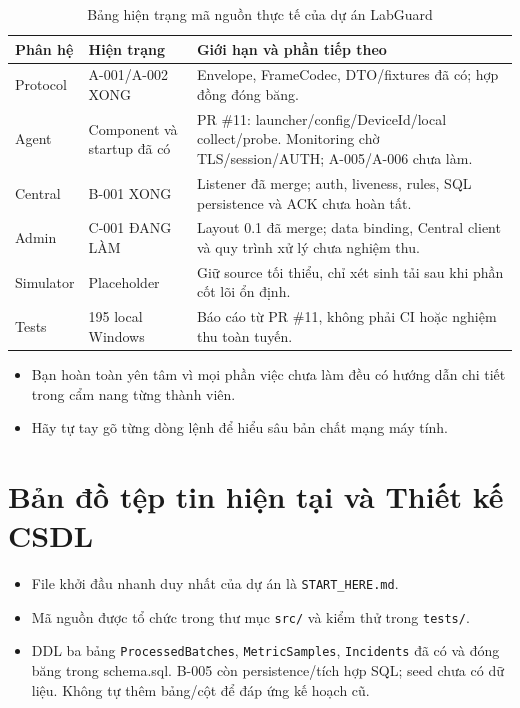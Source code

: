 \documentclass[12pt,a4paper]{article}
\begin{document}
\begin{table}[H]
  \centering
  \caption{Bảng hiện trạng mã nguồn thực tế của dự án LabGuard}
  \label{tab:source_status_detailed}
  \small
  \begin{tabularx}{\textwidth}{@{}p{22mm}p{34mm}X@{}}
    \toprule
    \textbf{Phân hệ} & \textbf{Hiện trạng} & \textbf{Giới hạn và phần tiếp theo} \\
    \midrule
    Protocol & A-001/A-002 XONG & Envelope, FrameCodec, DTO/fixtures đã có; hợp đồng đóng băng. \\
    Agent & Component và startup đã có & PR \#11: launcher/config/DeviceId/local collect/probe. Monitoring chờ TLS/session/AUTH; A-005/A-006 chưa làm. \\
    Central & B-001 XONG & Listener đã merge; auth, liveness, rules, SQL persistence và ACK chưa hoàn tất. \\
    Admin & C-001 ĐANG LÀM & Layout 0.1 đã merge; data binding, Central client và quy trình xử lý chưa nghiệm thu. \\
    Simulator & Placeholder & Giữ source tối thiểu, chỉ xét sinh tải sau khi phần cốt lõi ổn định. \\
    Tests & 195 local Windows & Báo cáo từ PR \#11, không phải CI hoặc nghiệm thu toàn tuyến. \\
    \bottomrule
  \end{tabularx}
\end{table}

\begin{takeawaybox}
\begin{itemize}[leftmargin=1.5em, itemsep=1pt]
  \item Bạn hoàn toàn yên tâm vì mọi phần việc chưa làm đều có hướng dẫn chi tiết trong cẩm nang từng thành viên.
  \item Hãy tự tay gõ từng dòng lệnh để hiểu sâu bản chất mạng máy tính.
\end{itemize}
\end{takeawaybox}

\section{Bản đồ tệp tin hiện tại và Thiết kế CSDL}

\begin{summarybox}
\begin{itemize}[leftmargin=1.5em, itemsep=1pt]
  \item File khởi đầu nhanh duy nhất của dự án là \texttt{START\_HERE.md}.
  \item Mã nguồn được tổ chức trong thư mục \texttt{src/} và kiểm thử trong \texttt{tests/}.
  \item DDL ba bảng \texttt{ProcessedBatches}, \texttt{MetricSamples}, \texttt{Incidents} đã có và đóng băng trong schema.sql. B-005 còn persistence/tích hợp SQL; seed chưa có dữ liệu. Không tự thêm bảng/cột để đáp ứng kế hoạch cũ.
\end{itemize}
\end{summarybox}
\end{document}
